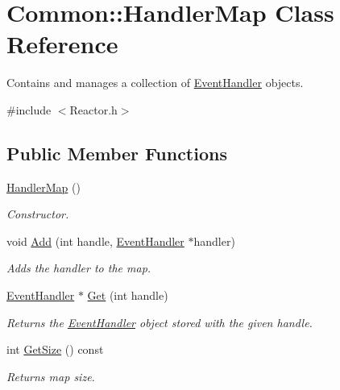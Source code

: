\hypertarget{class_common_1_1_handler_map}{\section{Common\-:\-:Handler\-Map Class Reference}
\label{class_common_1_1_handler_map}
}


Contains and manages a collection of \hyperlink{class_common_1_1_event_handler}{Event\-Handler} objects.  




{\ttfamily \#include $<$Reactor.\-h$>$}

\subsection*{Public Member Functions}
\begin{DoxyCompactItemize}
\item 
\hypertarget{class_common_1_1_handler_map_a2d10286fd249407ab3a0a7f09249a511}{\hyperlink{class_common_1_1_handler_map_a2d10286fd249407ab3a0a7f09249a511}{Handler\-Map} ()}\label{class_common_1_1_handler_map_a2d10286fd249407ab3a0a7f09249a511}

\begin{DoxyCompactList}\small\item\em Constructor. \end{DoxyCompactList}\item 
\hypertarget{class_common_1_1_handler_map_aeed749ec086027488e2e59070e452819}{void \hyperlink{class_common_1_1_handler_map_aeed749ec086027488e2e59070e452819}{Add} (int handle, \hyperlink{class_common_1_1_event_handler}{Event\-Handler} $\ast$handler)}\label{class_common_1_1_handler_map_aeed749ec086027488e2e59070e452819}

\begin{DoxyCompactList}\small\item\em Adds the handler to the map. \end{DoxyCompactList}\item 
\hypertarget{class_common_1_1_handler_map_a225eb315fc2c4f51e1bcad8cd06ae5b6}{\hyperlink{class_common_1_1_event_handler}{Event\-Handler} $\ast$ \hyperlink{class_common_1_1_handler_map_a225eb315fc2c4f51e1bcad8cd06ae5b6}{Get} (int handle)}\label{class_common_1_1_handler_map_a225eb315fc2c4f51e1bcad8cd06ae5b6}

\begin{DoxyCompactList}\small\item\em Returns the \hyperlink{class_common_1_1_event_handler}{Event\-Handler} object stored with the given handle. \end{DoxyCompactList}\item 
\hypertarget{class_common_1_1_handler_map_aeb3704cadcbcbdbb4ca0b70dc7e1a93b}{int \hyperlink{class_common_1_1_handler_map_aeb3704cadcbcbdbb4ca0b70dc7e1a93b}{Get\-Size} () const }\label{class_common_1_1_handler_map_aeb3704cadcbcbdbb4ca0b70dc7e1a93b}

\begin{DoxyCompactList}\small\item\em Returns map size. \end{DoxyCompactList}\end{DoxyCompactItemize}



